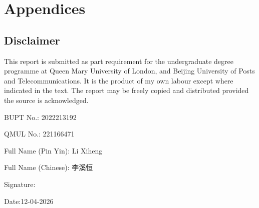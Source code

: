 \section*{Appendices}
{} \vspace{-1em}
\subsection*{Disclaimer}
{}
\vspace{-1em}
This report is submitted as part requirement for the undergraduate degree programme at  Queen Mary University of London, and Beijing University of Posts and Telecommunications. It is the product of my own labour except where indicated in the text. The report may be  freely copied and distributed provided the source is acknowledged.

\hspace*{\fill}

BUPT No.: 2022213192

QMUL No.: 221166471

Full Name (Pin Yin): Li Xiheng

Full Name (Chinese): 李溪恒

\hspace*{\fill}

Signature:

\hspace*{\fill}

Date:12-04-2026
